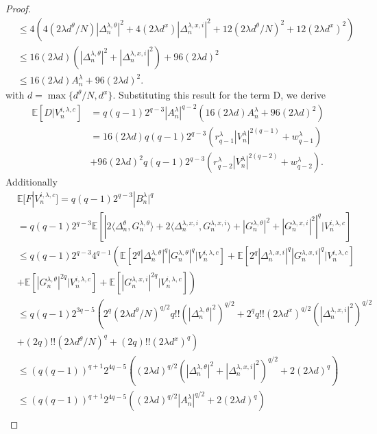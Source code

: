 \documentclass[a4paper, 10pt]{article}
\theoremstyle{plain}%
\begin{document}
\begin{proof}
\begin{align*}
&\leq 4\left(4(2\lambda d^{\theta}/N)|\Delta_n^{\lambda,\theta}|^2+4(2\lambda d^x)|\Delta_n^{\lambda,x,i}|^2+12(2\lambda d^{\theta}/N)^2+12(2\lambda d^x)^2\right)\\
&\leq 16(2\lambda d)\left(|\Delta_n^{\lambda,\theta}|^2+|\Delta_n^{\lambda,x,i}|^2\right)+96(2\lambda d)^2\\
&\leq  16(2\lambda d)A_n^{\lambda}+96(2\lambda d)^2.
\end{align*}
with $d=\max\{d^\theta/N,d^x\}$. Substituting this result for the term D, we derive
\begin{align*}
\mathbb{E}[D|V^{i,\lambda,c}_{n}]&=q(q-1)2^{q-3}|A_n^{\lambda}|^{q-2}\left(16(2\lambda d)A_n^{\lambda}+96(2\lambda d)^2\right)\\
&=16(2\lambda d)q(q-1)2^{q-3} \left(r_{q-1}^{\lambda}|V_n^{\lambda}|^{2(q-1)}+w_{q-1}^{\lambda}\right)\\&+96(2\lambda d)^2q(q-1)2^{q-3} \left(r_{q-2}^{\lambda}|V_n^{\lambda}|^{2(q-2)}+w_{q-2}^{\lambda}\right).
\end{align*}
Additionally
\begin{align*}
&\mathbb{E}[F|V^{i,\lambda,c}_{n}]=q(q-1)2^{q-3}|B_n^{\lambda}|^q\\
&=q(q-1)2^{q-3}\mathbb{E}\left[\left|2\langle \Delta_n^{\theta},G_n^{\lambda,\theta}\rangle+2\langle \Delta_n^{\lambda,x,i},G_n^{\lambda,x,i}\rangle+|G_n^{\lambda,\theta}|^2+|G_n^{\lambda,x,i}|^2\right|^q|V^{i,\lambda,c}_{n} \right]\\
&\leq q(q-1)2^{q-3}4^{q-1}\left(\mathbb{E}\left[2^q|\Delta_n^{\lambda,\theta}|^q|G_n^{\lambda,\theta}|^q|V^{i,\lambda,c}_{n}\right]+\mathbb{E}\left[2^q  |\Delta_n^{\lambda,x,i}|^q|G_n^{\lambda,x,i}|^q|V^{i,\lambda,c}_{n}\right]\right.\\
&\left.+\mathbb{E}\left[|G_n^{\lambda,\theta}|^{2q}|V^{i,\lambda,c}_{n}\right]+\mathbb{E}\left[|G_n^{\lambda,x,i}|^{2q}|V^{i,\lambda,c}_{n}\right]\right)\\
&\leq q(q-1)2^{3q-5}\left(2^q(2\lambda d^{\theta}/N)^{q/2}q!!\left(|\Delta_n^{\lambda,\theta}|^2\right)^{q/2}+2^q q!!(2\lambda d^x)^{q/2}\left(|\Delta_n^{\lambda,x,i}|^2\right)^{q/2}\right.\\
&\left.+(2q)!!(2\lambda d^{\theta}/N)^{q}+(2q)!!(2\lambda d^{x})^{q}\right)\\
&\leq (q(q-1))^{q+1}2^{4q-5}\left((2\lambda d)^{q/2}\left(|\Delta_n^{\lambda,\theta}|^2+ |\Delta_n^{\lambda,x,i}|^2\right)^{q/2}+2(2\lambda d)^q\right)\\
&\leq (q(q-1))^{q+1}2^{4q-5}\left((2\lambda d)^{q/2} \left|A_n^{\lambda}\right|^{q/2}+2(2\lambda d)^q\right)\\

\end{align*}
\end{proof}
\end{document}
